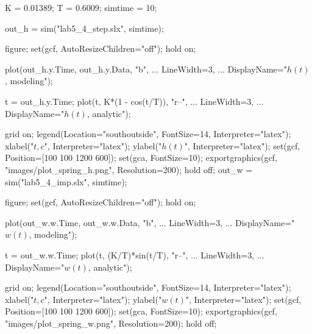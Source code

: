 \begin{matlabcode}
K = 0.01389;
T = 0.6009;
simtime = 10;

out_h = sim("lab5_4_step.slx", simtime);

figure;
set(gcf, AutoResizeChildren="off");
hold on;

plot(out_h.y.Time, out_h.y.Data, "b", ...
     LineWidth=3, ...
     DisplayName="$h(t)$, modeling");

t = out_h.y.Time;
plot(t, K*(1 - cos(t/T)), "r--", ...
     LineWidth=3, ...
     DisplayName="$h(t)$, analytic");

grid on;
legend(Location="southoutside", FontSize=14, Interpreter="latex");
xlabel("$t, c$", Interpreter="latex");
ylabel("$h(t)$", Interpreter="latex");
set(gcf, Position=[100 100 1200 600]);
set(gca, FontSize=10);
exportgraphics(gcf, "images/plot_spring_h.png", Resolution=200);
hold off;
out_w = sim("lab5_4_imp.slx", simtime);

figure;
set(gcf, AutoResizeChildren="off");
hold on;

plot(out_w.w.Time, out_w.w.Data, "b", ...
     LineWidth=3, ...
     DisplayName="$w(t)$, modeling");

t = out_w.w.Time;
plot(t, (K/T)*sin(t/T), "r--", ...
     LineWidth=3, ...
     DisplayName="$w(t)$, analytic");

grid on;
legend(Location="southoutside", FontSize=14, Interpreter="latex");
xlabel("$t, c$", Interpreter="latex");
ylabel("$w(t)$", Interpreter="latex");
set(gcf, Position=[100 100 1200 600]);
set(gca, FontSize=10);
exportgraphics(gcf, "images/plot_spring_w.png", Resolution=200);
hold off;
\end{matlabcode}



